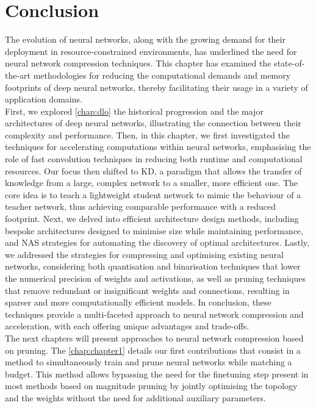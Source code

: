 \section{Conclusion}


The evolution of neural networks, along with the growing demand for their
deployment in resource-constrained environments, has underlined the need for
neural network compression techniques. This chapter has examined the
state-of-the-art methodologies for reducing the computational demands and memory
footprints of deep neural networks, thereby facilitating their usage in a
variety of application domains.\\

First, we explored \cref{chap:dlo} the historical progression and the major
architectures of deep neural networks, illustrating the connection between their
complexity and performance. Then, in this chapter, we first investigated the
techniques for accelerating computations within neural networks, emphasising the
role of fast convolution techniques in reducing both runtime and computational
resources. Our focus then shifted to \acl{KD}, a paradigm that allows the
transfer of knowledge from a large, complex network to a smaller, more efficient
one. The core idea is to teach a lightweight student network to mimic the
behaviour of a teacher network, thus achieving comparable performance with a
reduced footprint. Next, we delved into efficient architecture design methods,
including bespoke architectures designed to minimise size while maintaining
performance, and \acl{NAS} strategies for automating the discovery of optimal
architectures. Lastly, we addressed the strategies for compressing and
optimising existing neural networks, considering both quantisation and
binarisation techniques that lower the numerical precision of weights and
activations, as well as pruning techniques that remove redundant or
insignificant weights and connections, resulting in sparser and more
computationally efficient models. In conclusion, these techniques provide a
multi-faceted approach to neural network compression and acceleration, with each
offering unique advantages and trade-offs.\\

The next chapters will present approaches to neural network compression based on
pruning. The \cref{chap:chapter1} details our first contributions that consist
in a method to simultaneously train and prune neural networks while matching a
budget. This method allows bypassing the need for the finetuning step present in
most methods based on magnitude pruning by jointly optimising the topology and
the weights without the need for additional auxiliary parameters. 